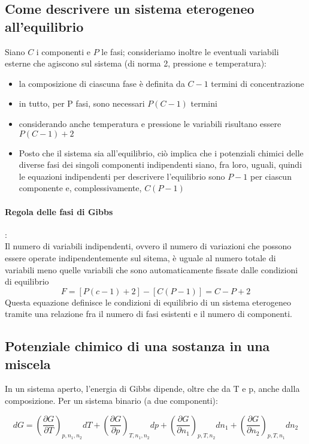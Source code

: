 \documentclass{article}
\newcommand{\dpar}[3]{\left(\frac{\partial #1}{\partial #2}\right)_{#3}d#2}
\begin{document}
\subsection{Come descrivere un sistema eterogeneo all'equilibrio}
Siano $C$ i componenti e $P$ le fasi; consideriamo inoltre le eventuali variabili esterne che agiscono sul sistema (di norma 2, pressione e temperatura):
\begin{itemize}
    \item la composizione di ciascuna fase è definita da $C-1$ termini di concentrazione
    \item in tutto, per P fasi, sono necessari $P(C-1)$ termini
    \item considerando anche temperatura e pressione le variabili risultano essere $P(C-1)+2$
    \item Posto che il sistema sia all'equilibrio, ciò implica che i potenziali chimici delle diverse fasi dei singoli componenti indipendenti siano, fra loro, uguali, quindi le equazioni indipendenti per descrivere l'equilibrio sono $P-1$ per ciascun componente e, complessivamente, $C(P-1)$
\end{itemize}
\paragraph{Regola delle fasi di Gibbs}:\\
Il numero di variabili indipendenti, ovvero il numero di variazioni che possono essere operate indipendentemente sul sitema, è uguale al numero totale di variabili meno quelle variabili che sono automaticamente fissate dalle condizioni di equilibrio
\begin{equation*}
    F=[P(c-1)+2]-[C(P-1)]=C-P+2
\end{equation*}
Questa equazione definisce le condizioni di equilibrio di un sistema eterogeneo tramite una relazione fra il numero di fasi esistenti e il numero di componenti.

\subsection{Potenziale chimico di una sostanza in una miscela}
In un sistema aperto, l'energia di Gibbs dipende, oltre che da T e p, anche dalla composizione. Per un sistema binario (a due componenti):

\begin{equation*}
    dG=\dpar{G}{T}{p,n_1,n_2}+\dpar{G}{p}{T,n_1,n_2}+\dpar{G}{n_1}{p,T,n_2}+\dpar{G}{n_2}{p,T,n_1}
\end{equation*}
\end{document}

